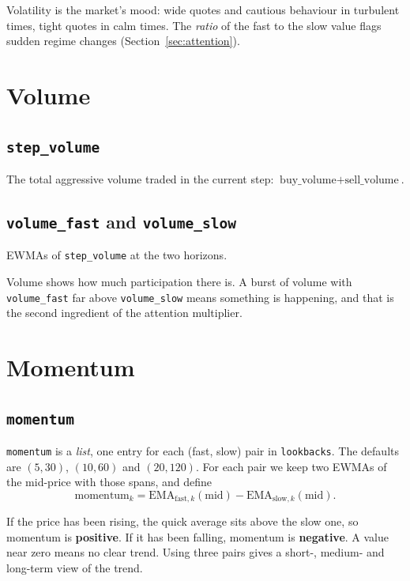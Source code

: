 \documentclass[11pt,a4paper]{article}
\newcommand{\code}[1]{\texttt{#1}}
\begin{document}
\begin{whyuse}
Volatility is the market's mood: wide quotes and cautious behaviour in turbulent times, tight quotes
in calm times. The \emph{ratio} of the fast to the slow value flags sudden regime changes
(Section~\ref{sec:attention}).
\end{whyuse}

\section{Volume}

\subsection{\code{step\_volume}}
The total aggressive volume traded in the current step: $\text{buy\_volume} + \text{sell\_volume}$.

\subsection{\code{volume\_fast} and \code{volume\_slow}}
EWMAs of \code{step\_volume} at the two horizons.

\begin{whyuse}
Volume shows how much participation there is. A burst of volume with \code{volume\_fast} far above
\code{volume\_slow} means something is happening, and that is the second ingredient of the attention
multiplier.
\end{whyuse}

\section{Momentum}

\subsection{\code{momentum}}
\code{momentum} is a \emph{list}, one entry for each (fast, slow) pair in \code{lookbacks}. The
defaults are $(5,30)$, $(10,60)$ and $(20,120)$. For each pair we keep two EWMAs of the mid-price with
those spans, and define
\[
  \text{momentum}_k = \text{EMA}_{\text{fast},k}(\text{mid}) - \text{EMA}_{\text{slow},k}(\text{mid}).
\]

\begin{intuition}
If the price has been rising, the quick average sits above the slow one, so momentum is
\textbf{positive}. If it has been falling, momentum is \textbf{negative}. A value near zero means no
clear trend. Using three pairs gives a short-, medium- and long-term view of the trend.
\end{intuition}
\end{document}
